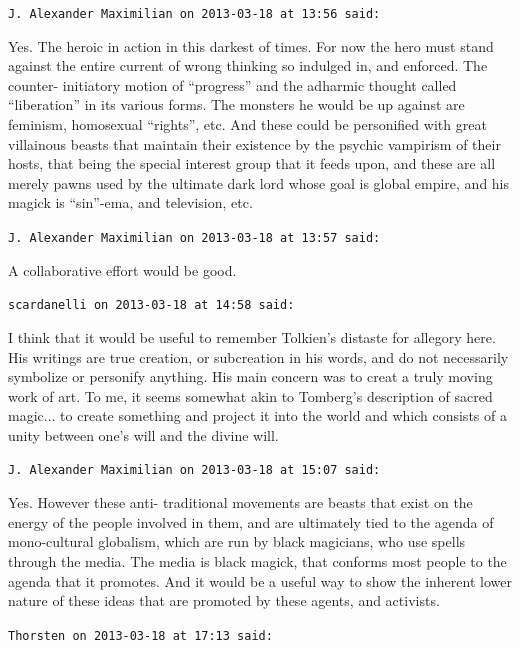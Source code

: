 \begin{footnotesize}
\begin{sffamily}
\hfill

\texttt{J. Alexander Maximilian on 2013-03-18 at 13:56 said:}

Yes. The heroic in action in this darkest of times. For now the hero must stand against the entire current of wrong thinking so indulged in, and enforced. The counter- initiatory motion of ``progress'' and the adharmic thought called ``liberation'' in its various forms. The monsters he would be up against are feminism, homosexual ``rights'', etc. And these could be personified with great villainous beasts that maintain their existence by the psychic vampirism of their hosts, that being the special interest group that it feeds upon, and these are all merely pawns used by the ultimate dark lord whose goal is global empire, and his magick is ``sin''-ema, and television, etc.

\hfill

\texttt{J. Alexander Maximilian on 2013-03-18 at 13:57 said:}

A collaborative effort would be good.

\hfill

\texttt{scardanelli on 2013-03-18 at 14:58 said:}

I think that it would be useful to remember Tolkien's distaste for allegory here. His writings are true creation, or subcreation in his words, and do not necessarily symbolize or personify anything. His main concern was to creat a truly moving work of art. To me, it seems somewhat akin to Tomberg's description of sacred magic... to create something and project it into the world and which consists of a unity between one's will and the divine will.

\hfill

\texttt{J. Alexander Maximilian on 2013-03-18 at 15:07 said:}

Yes. However these anti- traditional movements are beasts that exist on the energy of the people involved in them, and are ultimately tied to the agenda of mono-cultural globalism, which are run by black magicians, who use spells through the media. The media is black magick, that conforms most people to the agenda that it promotes. And it would be a useful way to show the inherent lower nature of these ideas that are promoted by these agents, and activists.

\hfill

\texttt{Thorsten on 2013-03-18 at 17:13 said:}


\end{sffamily}
\end{footnotesize}
